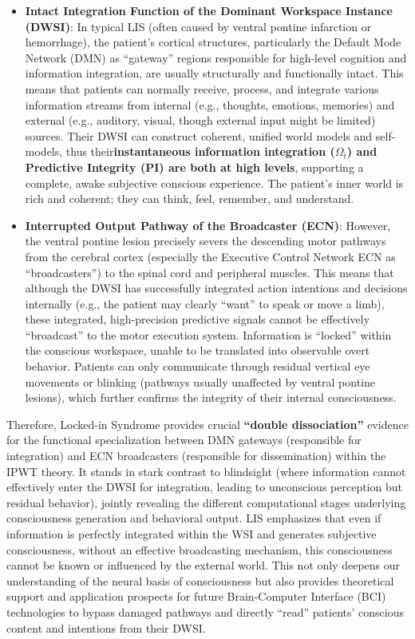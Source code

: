 \documentclass[
  a4paper]{article}
\begin{document}
\begin{itemize}
\item
  \textbf{Intact Integration Function of the Dominant Workspace Instance
  (DWSI)}: In typical LIS (often caused by ventral pontine infarction or
  hemorrhage), the patient's cortical structures, particularly the
  Default Mode Network (DMN) as ``gateway'' regions responsible for
  high-level cognition and information integration, are usually
  structurally and functionally intact. This means that patients can
  normally receive, process, and integrate various information streams
  from internal (e.g., thoughts, emotions, memories) and external (e.g.,
  auditory, visual, though external input might be limited) sources.
  Their DWSI can construct coherent, unified world models and
  self-models, thus their\textbf{instantaneous information integration
  (\(\Omega_t\)) and Predictive Integrity (PI) are both at high levels},
  supporting a complete, awake subjective conscious experience. The
  patient's inner world is rich and coherent; they can think, feel,
  remember, and understand.
\item
  \textbf{Interrupted Output Pathway of the Broadcaster (ECN)}: However,
  the ventral pontine lesion precisely severs the descending motor
  pathways from the cerebral cortex (especially the Executive Control
  Network ECN as ``broadcasters'') to the spinal cord and peripheral
  muscles. This means that although the DWSI has successfully integrated
  action intentions and decisions internally (e.g., the patient may
  clearly ``want'' to speak or move a limb), these integrated,
  high-precision predictive signals cannot be effectively ``broadcast''
  to the motor execution system. Information is ``locked'' within the
  conscious workspace, unable to be translated into observable overt
  behavior. Patients can only communicate through residual vertical eye
  movements or blinking (pathways usually unaffected by ventral pontine
  lesions), which further confirms the integrity of their internal
  consciousness.
\end{itemize}

Therefore, Locked-in Syndrome provides crucial \textbf{``double
dissociation''} evidence for the functional specialization between DMN
gateways (responsible for integration) and ECN broadcasters (responsible
for dissemination) within the IPWT theory. It stands in stark contrast
to blindsight (where information cannot effectively enter the DWSI for
integration, leading to unconscious perception but residual behavior),
jointly revealing the different computational stages underlying
consciousness generation and behavioral output. LIS emphasizes that even
if information is perfectly integrated within the WSI and generates
subjective consciousness, without an effective broadcasting mechanism,
this consciousness cannot be known or influenced by the external world.
This not only deepens our understanding of the neural basis of
consciousness but also provides theoretical support and application
prospects for future Brain-Computer Interface (BCI) technologies to
bypass damaged pathways and directly ``read'' patients' conscious
content and intentions from their DWSI.
\end{document}
